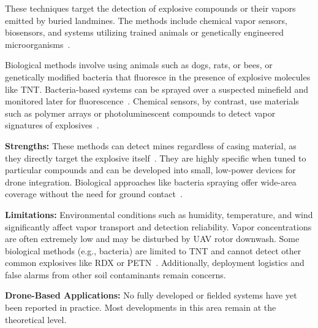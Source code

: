 These techniques target the detection of explosive compounds or their vapors emitted by buried landmines. The methods include chemical vapor sensors, biosensors, and systems utilizing trained animals or genetically engineered microorganisms~\cite{Gooneratne2004ARO,alqudsi2021review}.

Biological methods involve using animals such as dogs, rats, or bees, or genetically modified bacteria that fluoresce in the presence of explosive molecules like TNT. Bacteria-based systems can be sprayed over a suspected minefield and monitored later for fluorescence~\cite{cardonalandmine}. Chemical sensors, by contrast, use materials such as polymer arrays or photoluminescent compounds to detect vapor signatures of explosives~\cite{alqudsi2021review}.

\textbf{Strengths:} These methods can detect mines regardless of casing material, as they directly target the explosive itself~\cite{Gooneratne2004ARO,alqudsi2021review}. They are highly specific when tuned to particular compounds and can be developed into small, low-power devices for drone integration. Biological approaches like bacteria spraying offer wide-area coverage without the need for ground contact~\cite{cardonalandmine}.

\textbf{Limitations:} Environmental conditions such as humidity, temperature, and wind significantly affect vapor transport and detection reliability. Vapor concentrations are often extremely low and may be disturbed by UAV rotor downwash. Some biological methods (e.g., bacteria) are limited to TNT and cannot detect other common explosives like RDX or PETN~\cite{Gooneratne2004ARO,cardonalandmine}. Additionally, deployment logistics and false alarms from other soil contaminants remain concerns.

\textbf{Drone-Based Applications:} No fully developed or fielded systems have yet been reported in practice. Most developments in this area remain at the theoretical level.
